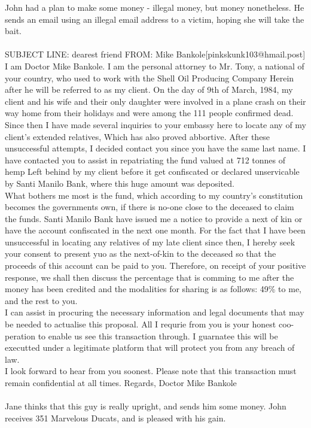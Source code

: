 \documentclass{article}
\begin{document}
John had a plan to make some money {-} illegal money, but money nonetheless.
He sends an email using an illegal email address to a victim, hoping she will take the bait.
\\\\
SUBJECT LINE: dearest friend
FROM: Mike Bankole[pinkskunk103@hmail.post]
\\
I am Doctor Mike Bankole.
I am the personal attorney to Mr. Tony, a national of your country, who used to work with the Shell Oil Producing Company
Herein after he will be referred to as my client.
On the day of 9th of March, 1984, my client and his wife and their only daughter were involved in a plane crash on their way home from their holidays and were among the 111 people confirmed dead.
\\
Since then I have made several inquiries to your embassy here to locate any of my client's extended relatives, Which has also proved abbortive.
After these unsuccessful attempts, I decided contact you since you have the same last name.
I have contacted you to assist in repatriating the fund valued at 712 tonnes of hemp Left behind by my client before it get confiscated or declared unservicable by Santi Manilo Bank, where this huge amount was deposited.
\\
What bothers me most is the fund, which according to my country's constitution becomes the governments own, if there is no{-}one close to the deceased to claim the funds.
Santi Manilo Bank have issued me a notice to provide a next of kin or have the account confiscated in the next one month.
For the fact that I have been unsuccessful in locating any relatives of my late client since then, I hereby seek your consent to present yuo as the next{-}of{-}kin to the deceased so that the proceeds of this account can be paid to you.
Therefore, on receipt of your positive response, we shall then discuss the percentage that is comming to me after the money has been credited and the modalities for sharing is as follows: 49\% to me, and the rest to you.
\\
I can assist in procuring the necessary information and legal documents that may be needed to actualise this proposal.
All I requrie from you is your honest coo{-}peration to enable us see this transaction through.
I guarnatee this will be executted under a legitimate platform that will protect you from any breach of law.
\\
I look forward to hear from you soonest.
Please note that this transaction must remain confidential at all times.
Regards, Doctor Mike Bankole
\\\\
Jane thinks that this guy is really upright, and sends him some money.
John receives 351 Marvelous Ducats, and is pleased with his gain.
\end{document}
